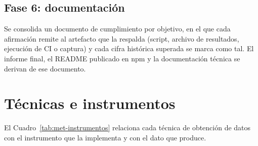 \subsection{Fase 6: documentación}
\label{subsec:met-f6}
Se consolida un documento de cumplimiento por objetivo, en el que cada afirmación remite al
artefacto que la respalda (script, archivo de resultados, ejecución de CI o captura) y cada
cifra histórica superada se marca como tal. El informe final, el README publicado en npm y la
documentación técnica se derivan de ese documento.

\section{Técnicas e instrumentos}
\label{sec:met-instrumentos}

El Cuadro~\ref{tab:met-instrumentos} relaciona cada técnica de obtención de datos con el
instrumento que la implementa y con el dato que produce.

